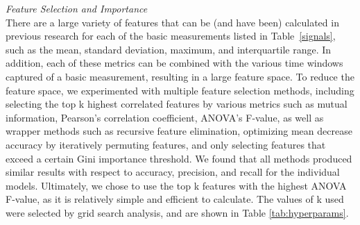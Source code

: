 


\noindent\textit{Feature Selection and Importance}\\
There are a large variety of features that can be (and have been) calculated in previous research for each of the basic measurements listed in Table~\ref{signals}, such as the mean, standard deviation, maximum, and interquartile range. In addition, each of these metrics can be combined with the various time windows captured of a basic measurement, resulting in a large feature space. To reduce the feature space, we experimented with multiple feature selection methods, including selecting the top k highest correlated features by various metrics such as mutual information, Pearson's correlation coefficient, ANOVA's F-value, as well as wrapper methods such as recursive feature elimination, optimizing mean decrease accuracy by iteratively permuting features, and only selecting features that exceed a certain Gini importance threshold. We found that all methods produced similar results with respect to accuracy, precision, and recall for the individual models. Ultimately, we chose to use the top k features with the highest ANOVA F-value, as it is relatively simple and efficient to calculate. The values of k used were selected by grid search analysis, and are shown in Table \ref{tab:hyperparams}. 

